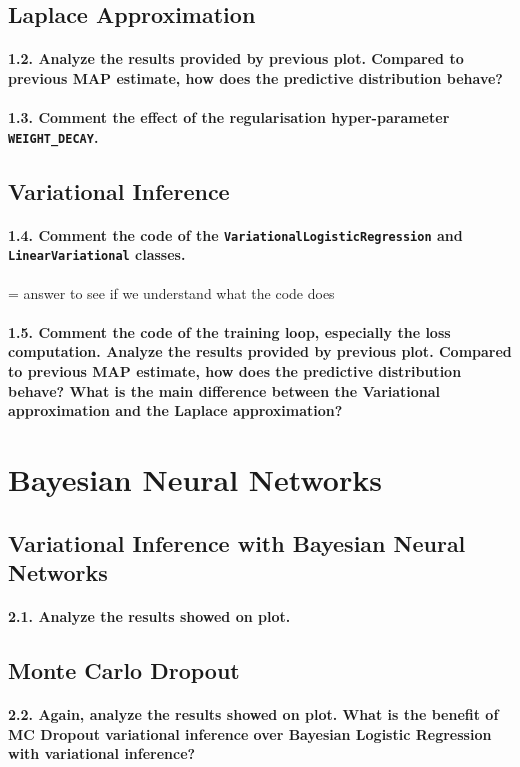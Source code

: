 \subsection{Laplace Approximation}
\paragraph{1.2. Analyze the results provided by previous plot. Compared to previous MAP estimate, how does the predictive distribution behave?}

\paragraph{1.3. Comment the effect of the regularisation hyper-parameter  \texttt{WEIGHT\_DECAY}.}

\subsection{Variational Inference}
\paragraph{1.4. Comment the code of the \texttt{VariationalLogisticRegression} and \texttt{LinearVariational} classes.}
= answer to see if we understand what the code does

\paragraph{1.5. Comment the code of the training loop, especially the loss computation. Analyze the results provided by previous plot. Compared to previous MAP estimate, how does the predictive distribution behave? What is the main difference between the Variational approximation and the Laplace approximation?}

\section{Bayesian Neural Networks}
\subsection{Variational Inference with Bayesian Neural Networks}
\paragraph{2.1. Analyze the results showed on plot.}

\subsection{Monte Carlo Dropout}
\paragraph{2.2. Again, analyze the results showed on plot. What is the benefit of MC Dropout variational inference over Bayesian Logistic Regression with variational inference?}